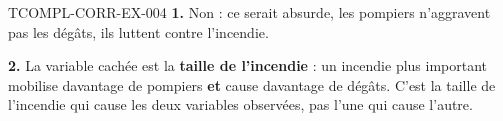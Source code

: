 \begin{corrige}{TCOMPL-CORR-EX-004}
\textbf{1.} Non : ce serait absurde, les pompiers n'aggravent pas les dégâts, ils luttent contre l'incendie.

\textbf{2.} La variable cachée est la \textbf{taille de l'incendie} : un incendie plus important mobilise davantage de pompiers \textbf{et} cause davantage de dégâts. C'est la taille de l'incendie qui cause les deux variables observées, pas l'une qui cause l'autre.
\end{corrige}

%
%
%
%
